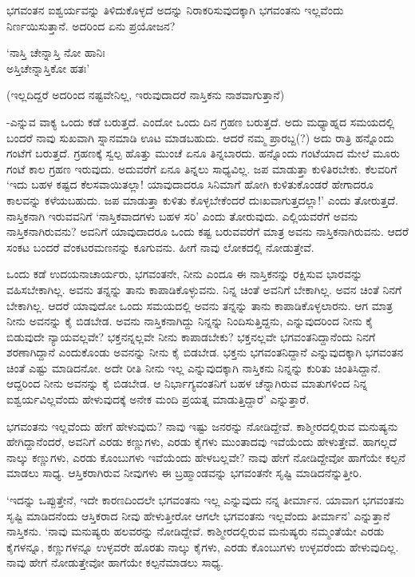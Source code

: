 ಭಗವಂತನ ಐಶ್ವರ್ಯವನ್ನು ತಿಳಿದುಕೊಳ್ಳದೆ ಅದನ್ನು ನಿರಾಕರಿಸುವುದಕ್ಕಾಗಿ ಭಗವಂತನು ಇಲ್ಲವೆಂದು ನಿರ್ಣಯಿಸುತ್ತಾನೆ. ಅದರಿಂದ ಏನು ಪ್ರಯೋಜನ?

\begin{shloka}
`ನಾಸ್ತಿ ಚೇನ್ನಾಸ್ತಿ ನೋ ಹಾನಿಃ\\
ಅಸ್ತಿಚೇನ್ನಾಸ್ತಿಕೋ ಹತಃ'
\end{shloka}

(ಇಲ್ಲದಿದ್ದರೆ ಅದರಿಂದ ನಷ್ಟವೇನಿಲ್ಲ, ಇರುವುದಾದರೆ ನಾಸ್ತಿಕನು ನಾಶವಾಗುತ್ತಾನೆ)

-ಎನ್ನುವ ವಾಕ್ಯ ಒಂದು ಕಡೆ ಬರುತ್ತದೆ. ಎಂದೋ ಒಂದು ದಿನ ಗ್ರಹಣ ಬರುತ್ತದೆ. ಅದು ಮಧ್ಯಾಹ್ನದ ಸಮಯದಲ್ಲಿ ಬಂದರೆ ನಾವು ಸುಖವಾಗಿ ಸ್ನಾನಮಾಡಿ ಊಟ ಮಾಡಬಹುದು. ಆದರೆ ನಮ್ಮ ಪ್ರಾರಬ್ದ(?) ಅದು ರಾತ್ರಿ ಹನ್ನೊಂದು ಗಂಟೆಗೆ ಬರುತ್ತದೆ. ಗ್ರಹಣಕ್ಕೆ ಸ್ವಲ್ಪ ಹೊತ್ತು ಮುಂಚೆ ಏನೂ ತಿನ್ನಬಾರದು. ಹನ್ನೊಂದು ಗಂಟೆಯಾದ ಮೇಲೆ ಮೂರು ಗಂಟೆ ಕಾಲ ಗ್ರಹಣ ಇರುವುದು. ಅದುವರೆಗೆ ಏನೂ ತಿನ್ನಲು ಸಾಧ್ಯವಿಲ್ಲ. ಜಪ ಮಾಡುತ್ತಾ ಕುಳಿತಿರಬೇಕು. ಕೆಲವರಿಗೆ `ಇದು ಬಹಳ ಕಷ್ಟದ ಕೆಲಸವಾಯಿತಲ್ಲಾ! ಯಾವುದಾದರೂ ಸಿನಿಮಾಗೆ ಹೋಗಿ ಕುಳಿತುಕೊಂಡರೆ ಹೇಗಾದರೂ ಕಾಲವನ್ನು ಕಳೆಯಬಹುದು. ಜಪ ಮಾಡುತ್ತಾ ಕುಳಿತು ಕೊಳ್ಳಬೇಕೆಂದರೆ ದುಃಖವಾಗುತ್ತದಲ್ಲಾ!' ಎಂದು ತೋರುತ್ತದೆ. ನಾಸ್ತಿಕನಾಗಿ ಇರುವವನಿಗೆ `ನಾಸ್ತಿಕವಾದಗಳು ಬಹಳ ಸರಿ' ಎಂದು ತೋರುವುದು. ಎಲ್ಲಿಯವರೆಗೆ ಅವನು ನಾಸ್ತಿಕನಾಗಿರುವನು? ಅವನಿಗೆ ಯಾವುದಾದರೂ ಒಂದು ಕಷ್ಟ ಬರುವವರೆಗೆ ಮಾತ್ರ ಅವನು ನಾಸ್ತಿಕನಾಗಿರುವನು. ಆದರೆ ಸಂಕಟ ಬಂದರೆ ವೆಂಕಟರಮಣನನ್ನು ಕೂಗುವನು. ಹೀಗೆ ನಾವು ಲೋಕದಲ್ಲಿ ನೋಡುತ್ತೇವೆ.

ಒಂದು ಕಡೆ ಉದಯನಾಚಾರ್ಯರು, ಭಗವಂತನೇ, ನೀನು ಎಂದೂ ಈ ನಾಸ್ತಿಕನನ್ನು ರಕ್ಷಿಸುವ ಭಾರವನ್ನು ವಹಿಸಬೇಕಾಗಿಲ್ಲ. ಅವನು ತನ್ನನ್ನು ತಾನು ಕಾಪಾಡಿಕೊಳ್ಳುವನು. ನಿನ್ನ ಚಿಂತೆ ಅವನಿಗೆ ಬೇಕಾಗಿಲ್ಲ. ಅವನ ಚಿಂತೆ ನಿನಗೆ ಬೇಕಾಗಿಲ್ಲ. ಆದರೆ ಯಾವುದೋ ಒಂದು ಸಮಯದಲ್ಲಿ ಅವನು ತನ್ನನ್ನು ತಾನು ಕಾಪಾಡಿಕೊಳ್ಳಲಾರನು. ಆಗ ಮಾತ್ರ ನೀನು ಅವನನ್ನು ಕೈ ಬಿಡಬೇಡ. ಅವನು ನಾಸ್ತಿಕನಾಗಿದ್ದು ನಿನ್ನನ್ನು ನಿಂದಿಸುತ್ತಿದ್ದನು, ಎನ್ನುವುದರಿಂದ ನೀನು ಕೈ ಬಿಡುವುದೇ ನ್ಯಾಯವಲ್ಲವೇ? ಭಕ್ತನನ್ನಲ್ಲವೇ ನೀನು ಕಾಪಾಡಬೇಕು? ಭಕ್ತನಲ್ಲವೇ ಭಗವಂತನಿದ್ದಾನೆಂದು ನಿನಗೆ ಶರಣಾಗಿದ್ದಾನೆ ಎಂದುಕೊಂಡು ಅವನನ್ನು ನೀನು ಕೈ ಬಿಡಬೇಡ. ಭಕ್ತನು ಭಗವಂತನಿದ್ದಾನೆ ಎನ್ನುವುದಕ್ಕಾಗಿ ಭಗವಂತನ ಚಿಂತೆ ಎಷ್ಟು ಮಾಡಿದನೋ. ಅದೇ ರೀತಿ ನೀನು ಇಲ್ಲ ಎನ್ನುವುದಕ್ಕಾಗಿ ನಾಸ್ತಿಕನು ನಿನ್ನನ್ನು ಕುರಿತು ಚಿಂತಿಸಿದ್ದಾನೆ. ಆದ್ದರಿಂದ ನೀನು ಅವನನ್ನು ಕೈ ಬಿಡಬೇಡ. ಆ ನಿರ್ಭಾಗ್ಯವಂತನಿಗೆ ಬಹಳ ಚೆನ್ನಾಗಿರುವ ಮಾತುಗಳಿಂದ ನಿನ್ನ ಐಶ್ವರ್ಯವಿಲ್ಲವೆಂದು ಹೇಳುವುದಕ್ಕೆ ಅನೇಕ ಮಂದಿ ಪ್ರಯತ್ನ ಮಾಡುತ್ತಿದ್ದಾರೆ' ಎನ್ನುತ್ತಾರೆ.

ಭಗವಂತನು ಇಲ್ಲವೆಂದು ಹೇಗೆ ಹೇಳುವುದು? ನಾವು ಇಷ್ಟು ಜನರನ್ನು ನೋಡಿದ್ದೇವೆ. ಕಾಶ್ಮೀರದಲ್ಲಿರುವ ಮನುಷ್ಯನು ಹೇಗಿದ್ದಾನೆಂದರೆ, ಅವನಿಗೆ ಎರಡು ಕಣ್ಣುಗಳು, ಎರಡು ಕೈಗಳು ಮುಂತಾದವು ಇವೆಯೆಂದು ಹೇಳುತ್ತೇವೆ. ಹಾಗಲ್ಲದೆ ನಾಲ್ಕು ಕಣ್ಣುಗಳು, ಎರಡು ಕೊಂಬುಗಳು ಇವೆಯೆಂದು ಹೇಳಬಲ್ಲವೇ? ನಾವು ಹೇಗೆ ನೋಡಿದ್ದೇವೋ ಹಾಗೆಯೇ ಕಲ್ಪನೆ ಮಾಡಲು ಸಾಧ್ಯ. ಆಸ್ತಿಕರಾಗಿರುವ ನೀವುಗಳು ಈ ಬ್ರಹ್ಮಾಂಡವನ್ನು ಭಗವಂತನೇ ಸೃಷ್ಟಿ ಮಾಡಿದನೆನ್ನುತ್ತೀರಿ.

`ಇದನ್ನು ಒಪ್ಪುತ್ತೇನೆ, ಇದೇ ಕಾರಣದಿಂದಲೇ ಭಗವಂತನು ಇಲ್ಲ ಎನ್ನುವುದು ನನ್ನ ತೀರ್ಮಾನ. ಯಾವಾಗ ಭಗವಂತನು ಸೃಷ್ಟಿ ಮಾಡಿದನೆಂದು ಆಸ್ತಿಕರಾದ ನೀವು ಹೇಳುತ್ತೀರೋ ಆಗಲೇ ಭಗವಂತನು ಇಲ್ಲವೆಂದು ತೀರ್ಮಾನ' ಎನ್ನುತ್ತಾನೆ ನಾಸ್ತಿಕನು. `ನಾವು ಮನುಷ್ಯರು ಹಲವರನ್ನು ನೋಡಿದ್ದೇವೆ. ಕಾಶ್ಮೀರದಲ್ಲಿರುವ ಮನುಷ್ಯರು ನಮ್ಮಂತೆಯೇ ಎರಡು ಕೈಗಳನ್ನೂ, ಕಣ್ಣುಗಳನ್ನೂ ಉಳ್ಳವರೇ ಹೊರತು ನಾಲ್ಕು ಕೈಗಳು, ಎರಡು ಕೊಂಬುಗಳು ಉಳ್ಳವರೆಂದು ಹೇಳುವುದಿಲ್ಲ. ನಾವು ಹೇಗೆ ನೋಡುತ್ತೇವೋ ಹಾಗೆಯೇ ಕಲ್ಪನೆಮಾಡಲು ಸಾಧ್ಯ.

